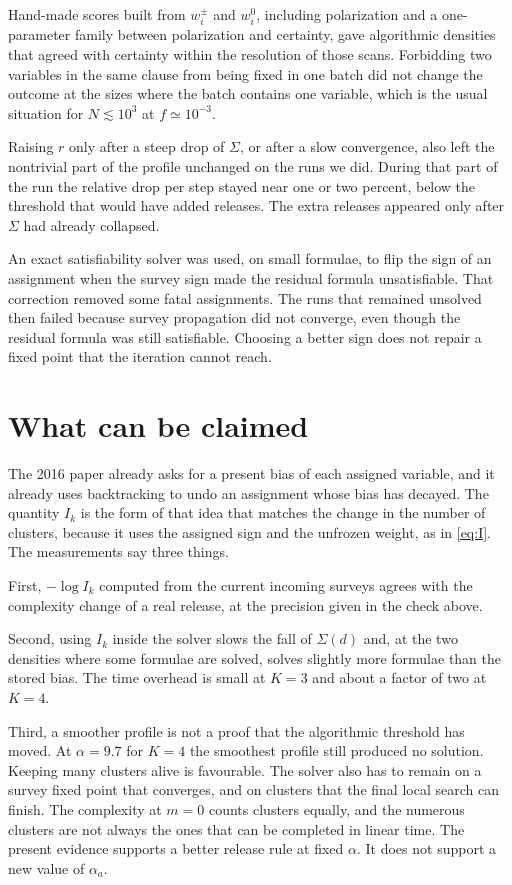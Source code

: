 \documentclass[11pt]{article}
\begin{document}
Hand-made scores built from $w^{\pm}_i$ and $w^0_i$, including polarization and a one-parameter family between polarization and certainty, gave algorithmic densities that agreed with certainty within the resolution of those scans. Forbidding two variables in the same clause from being fixed in one batch did not change the outcome at the sizes where the batch contains one variable, which is the usual situation for $N\lesssim 10^3$ at $f\simeq 10^{-3}$.

Raising $r$ only after a steep drop of $\Sigma$, or after a slow convergence, also left the nontrivial part of the profile unchanged on the runs we did. During that part of the run the relative drop per step stayed near one or two percent, below the threshold that would have added releases. The extra releases appeared only after $\Sigma$ had already collapsed.

An exact satisfiability solver was used, on small formulae, to flip the sign of an assignment when the survey sign made the residual formula unsatisfiable. That correction removed some fatal assignments. The runs that remained unsolved then failed because survey propagation did not converge, even though the residual formula was still satisfiable. Choosing a better sign does not repair a fixed point that the iteration cannot reach.

\section{What can be claimed}

The 2016 paper already asks for a present bias of each assigned variable, and it already uses backtracking to undo an assignment whose bias has decayed. The quantity $I_k$ is the form of that idea that matches the change in the number of clusters, because it uses the assigned sign and the unfrozen weight, as in \eqref{eq:I}. The measurements say three things.

First, $-\log I_k$ computed from the current incoming surveys agrees with the complexity change of a real release, at the precision given in the check above.

Second, using $I_k$ inside the solver slows the fall of $\Sigma(d)$ and, at the two densities where some formulae are solved, solves slightly more formulae than the stored bias. The time overhead is small at $K=3$ and about a factor of two at $K=4$.

Third, a smoother profile is not a proof that the algorithmic threshold has moved. At $\alpha=9.7$ for $K=4$ the smoothest profile still produced no solution. Keeping many clusters alive is favourable. The solver also has to remain on a survey fixed point that converges, and on clusters that the final local search can finish. The complexity at $m=0$ counts clusters equally, and the numerous clusters are not always the ones that can be completed in linear time. The present evidence supports a better release rule at fixed $\alpha$. It does not support a new value of $\alpha_a$.
\end{document}
